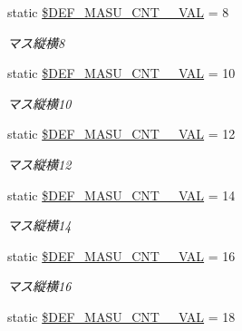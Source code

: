 \begin{DoxyCompactItemize}
static \hyperlink{class_reversi_const_a0ae1ba6bd2dfeac3259b9b6afaaed4d2}{\$\+D\+E\+F\+\_\+\+M\+A\+S\+U\+\_\+\+C\+N\+T\+\_\+\_\+\+V\+AL} = 8
\begin{DoxyCompactList}\small\item\em マス縦横8 \end{DoxyCompactList}\item 
\mbox{\label{class_reversi_const_a711060d4402e0e7f4e5ea5f9c3d0e407}} 
static \hyperlink{class_reversi_const_a711060d4402e0e7f4e5ea5f9c3d0e407}{\$\+D\+E\+F\+\_\+\+M\+A\+S\+U\+\_\+\+C\+N\+T\+\_\+\_\+\+V\+AL} = 10
\begin{DoxyCompactList}\small\item\em マス縦横10 \end{DoxyCompactList}\item 
\mbox{\label{class_reversi_const_a78b9d9b338b9f7293eb44fbc88b44a7e}} 
static \hyperlink{class_reversi_const_a78b9d9b338b9f7293eb44fbc88b44a7e}{\$\+D\+E\+F\+\_\+\+M\+A\+S\+U\+\_\+\+C\+N\+T\+\_\+\_\+\+V\+AL} = 12
\begin{DoxyCompactList}\small\item\em マス縦横12 \end{DoxyCompactList}\item 
\mbox{\label{class_reversi_const_a0fa489876583e3c7afae744b9c4e2fd1}} 
static \hyperlink{class_reversi_const_a0fa489876583e3c7afae744b9c4e2fd1}{\$\+D\+E\+F\+\_\+\+M\+A\+S\+U\+\_\+\+C\+N\+T\+\_\+\_\+\+V\+AL} = 14
\begin{DoxyCompactList}\small\item\em マス縦横14 \end{DoxyCompactList}\item 
\mbox{\label{class_reversi_const_ab29f123aba64c8d34c895ef700ad9c6b}} 
static \hyperlink{class_reversi_const_ab29f123aba64c8d34c895ef700ad9c6b}{\$\+D\+E\+F\+\_\+\+M\+A\+S\+U\+\_\+\+C\+N\+T\+\_\+\_\+\+V\+AL} = 16
\begin{DoxyCompactList}\small\item\em マス縦横16 \end{DoxyCompactList}\item 
\mbox{\label{class_reversi_const_a4232cfd29ffc57b86911fef7b04ba056}} 
static \hyperlink{class_reversi_const_a4232cfd29ffc57b86911fef7b04ba056}{\$\+D\+E\+F\+\_\+\+M\+A\+S\+U\+\_\+\+C\+N\+T\+\_\+\_\+\+V\+AL} = 18

\end{DoxyCompactItemize}
